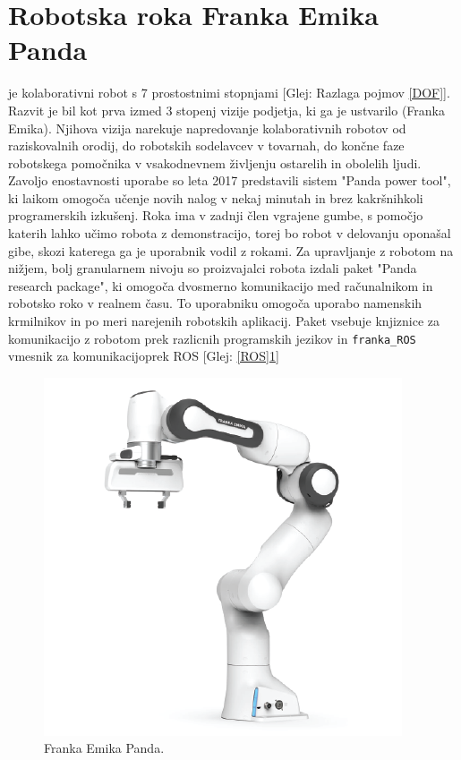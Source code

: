 \documentclass[a4paper,twoside,openright,12pt,slovene]{book}
\begin{document}
\section{Robotska roka Franka Emika Panda} je kolaborativni robot s 7 prostostnimi stopnjami [Glej: Razlaga pojmov \ref{DOF}]. Razvit je bil kot prva izmed 3 stopenj vizije podjetja, ki ga je ustvarilo (Franka Emika). Njihova vizija narekuje napredovanje kolaborativnih robotov od raziskovalnih orodij, do robotskih sodelavcev v tovarnah, do končne faze robotskega pomočnika v vsakodnevnem življenju ostarelih in obolelih ljudi. Zavoljo enostavnosti uporabe so leta 2017 predstavili sistem "Panda power tool", ki laikom omogoča učenje novih nalog v nekaj minutah in brez kakršnihkoli programerskih izkušenj. Roka ima v zadnji člen vgrajene gumbe, s pomočjo katerih lahko učimo robota z demonstracijo, torej bo robot v delovanju oponašal gibe, skozi katerega ga je uporabnik vodil z rokami. Za upravljanje z robotom na nižjem, bolj granularnem nivoju so proizvajalci robota izdali paket "Panda research package", ki omogoča dvosmerno komunikacijo med računalnikom in robotsko roko v realnem času. To uporabniku omogoča uporabo namenskih krmilnikov in po meri narejenih robotskih aplikacij. Paket vsebuje knjiznice za komunikacijo z robotom prek razlicnih programskih jezikov in \verb|franka_ROS| vmesnik za komunikacijoprek ROS [Glej: \ref{ROS}\ref{panda}] \cite{panda_website}

\begin{figure}[h]
    \centering
    \includegraphics[width=0.75\columnwidth]{Slike/panda.png}
    \caption{\label{panda} Franka Emika Panda.}
\end{figure}
\end{document}
